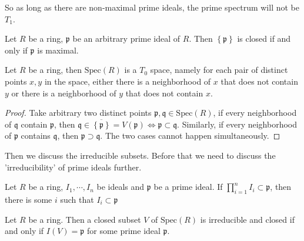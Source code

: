\documentclass{note-eng}
\begin{document}
So as long as there are non-maximal prime ideals, the prime spectrum will not be $T_1$.

\begin{corollary}
    Let $R$ be a ring, $\mathfrak{p}$ be an arbitrary prime ideal of $R$. Then $\left\lbrace \mathfrak{p} \right\rbrace$ is closed if and only if $\mathfrak{p}$ is maximal.
\end{corollary}

\begin{corollary}
    Let $R$ be a ring, then $\mathrm{Spec}(R)$ is a $T_0$ space, namely for each pair of distinct points $x, y$ in the space, either there is a neighborhood of $x$ that does not contain $y$ or there is a neighborhood of $y$ that does not contain $x$.
\end{corollary}

\begin{proof}
    Take arbitrary two distinct points $\mathfrak{p}, \mathfrak{q} \in \mathrm{Spec}(R)$, if every neighborhood of $\mathfrak{q}$ contain $\mathfrak{p}$, then $\mathfrak{q} \in \overline{\left\lbrace \mathfrak{p} \right\rbrace} = V(\mathfrak{p}) \Leftrightarrow \mathfrak{p} \subset \mathfrak{q}$. Similarly, if every neighborhood of $\mathfrak{p}$ contains $\mathfrak{q}$, then $\mathfrak{p} \supset \mathfrak{q}$. The two cases cannot happen simultaneously.
\end{proof}

Then we discuss the irreducible subsets. Before that we need to discuss the 'irreducibility' of prime ideals further.

\begin{proposition}
    Let $R$ be a ring, $I_1, \cdots, I_n$ be ideals and $\mathfrak{p}$ be a prime ideal. If $\prod\limits_{i = 1}^{n} I_i \subset \mathfrak{p}$, then there is some $i$ such that $I_i \subset \mathfrak{p}$
\end{proposition}


\begin{proposition}
    Let $R$ be a ring. Then a closed subset $V$ of $\mathrm{Spec}(R)$ is irreducible and closed if and only if $I(V) = \mathfrak{p}$ for some prime ideal $\mathfrak{p}$.
\end{proposition}
\end{document}
